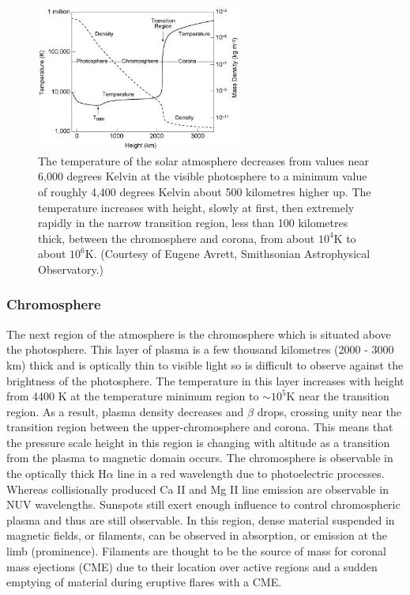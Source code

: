\begin{figure}[H]
  \begin{center}
    \includegraphics[width=0.6\textwidth]{solar-atm-plot}
\caption{The temperature of the solar atmosphere decreases from values near 6,000 degrees Kelvin at the visible photosphere to a minimum value of roughly 4,400 degrees Kelvin about 500 kilometres higher up. The temperature increases with height, slowly at first, then extremely rapidly in the narrow transition region, less than 100 kilometres thick, between the chromosphere and corona, from about $10^{4}$K to about $10^{6}$K. (Courtesy of Eugene Avrett, Smithsonian Astrophysical Observatory.)}\label{solatm}
  \end{center}
\end{figure}

\subsubsection{Chromosphere}
The next region of the atmosphere is the chromosphere which is situated above the photosphere. This layer of plasma is a few thousand kilometres (2000 - 3000 km) thick and is optically thin to visible light so is difficult to observe against the brightness of the photosphere. The temperature in this layer increases with height from 4400 K at the temperature minimum region to $\sim10^{5}$K near the transition region. As a result, plasma density decreases and $\beta$ drops, crossing unity near the transition region between the upper-chromosphere and corona. This means that the pressure scale height in this region is changing with altitude as a transition from the plasma to magnetic domain occurs. The chromosphere is observable in the optically thick H$\alpha$ line in a red wavelength due to photoelectric processes. Whereas collisionally produced Ca II and Mg II line emission are observable in NUV wavelengths. Sunspots still exert enough influence to control chromospheric plasma and thus are still observable. In this region, dense material suspended in magnetic fields, or filaments, can be observed in absorption, or emission at the limb (prominence). Filaments are thought to be the source of mass for coronal mass ejections (CME) due to their location over active regions and a sudden emptying of material during eruptive flares with a CME. 

